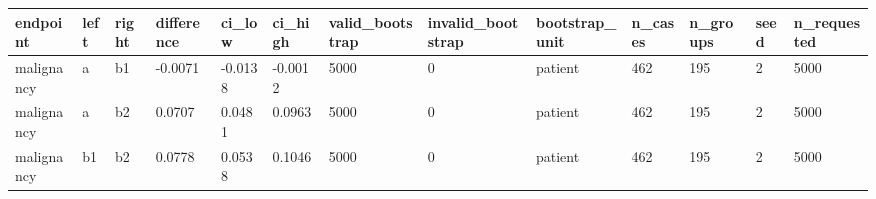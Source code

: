 \begin{tabular}{lllllllllllll}
\hline
endpoint & left & right & difference & ci\_low & ci\_high & valid\_bootstrap & invalid\_bootstrap & bootstrap\_unit & n\_cases & n\_groups & seed & n\_requested \\
\hline
malignancy & a & b1 & -0.0071 & -0.0138 & -0.0012 & 5000 & 0 & patient & 462 & 195 & 2 & 5000 \\
malignancy & a & b2 & 0.0707 & 0.0481 & 0.0963 & 5000 & 0 & patient & 462 & 195 & 2 & 5000 \\
malignancy & b1 & b2 & 0.0778 & 0.0538 & 0.1046 & 5000 & 0 & patient & 462 & 195 & 2 & 5000 \\
\hline
\end{tabular}
